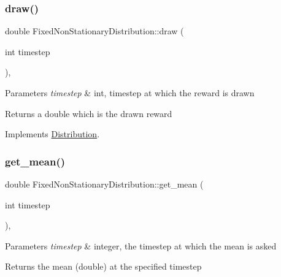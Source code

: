\subsubsection{\texorpdfstring{draw()}{draw()}}
{\footnotesize\ttfamily double Fixed\+Non\+Stationary\+Distribution\+::draw (\begin{DoxyParamCaption}\item[{int}]{timestep }\end{DoxyParamCaption})\hspace{0.3cm}{\ttfamily [override]}, {\ttfamily [virtual]}}


\begin{DoxyParams}{Parameters}
{\em timestep} & int, timestep at which the reward is drawn \\
\hline
\end{DoxyParams}
\begin{DoxyReturn}{Returns}
a double which is the drawn reward 
\end{DoxyReturn}


Implements \mbox{\hyperlink{class_distribution_a742b398af4a461243028cce3c47d8080}{Distribution}}.

\mbox{\label{class_fixed_non_stationary_distribution_aa9ed51fbf731f288a76a3a9e0aee8390}} 
\subsubsection{\texorpdfstring{get\+\_\+mean()}{get\_mean()}}
{\footnotesize\ttfamily double Fixed\+Non\+Stationary\+Distribution\+::get\+\_\+mean (\begin{DoxyParamCaption}\item[{int}]{timestep }\end{DoxyParamCaption})\hspace{0.3cm}{\ttfamily [override]}, {\ttfamily [virtual]}}


\begin{DoxyParams}{Parameters}
{\em timestep} & integer, the timestep at which the mean is asked \\
\hline
\end{DoxyParams}
\begin{DoxyReturn}{Returns}
the mean (double) at the specified timestep 
\end{DoxyReturn}


